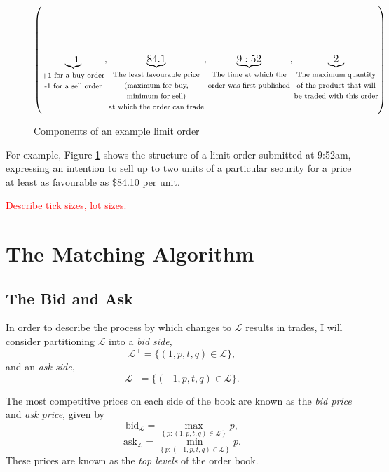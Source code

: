 \documentclass[honours,12pt]{unswthesis}
\numberwithin{equation}{section}
\begin{document}
\begin{figure}[h]
	$$\left(\underbrace{-1}_{\fontsize{8}{8}\begin{matrix} \text{+1 for a buy order}\\ \text{-1 for a sell order}\end{matrix}}\fontsize{12}{8},\underbrace{84.1}_{\fontsize{8}{8}\begin{matrix}\text{The least favourable price}\\\text{(maximum for buy,}\\\text{minimum for sell)}\\\text{at which the order can trade}\end{matrix}}\fontsize{12}{8},\underbrace{9:52}_{\fontsize{8}{8}\begin{matrix}\text{The time at which the}\\\text{order was first published}\end{matrix}}\fontsize{12}{8},\underbrace{2}_{\fontsize{8}{8}\begin{matrix}\text{The maximum quantity}\\\text{of the product that will}\\\text{be traded with this order}\end{matrix}}\right)$$
	\caption{Components of an example limit order}
	\label{fig:limitorder}
\end{figure}

For example, Figure \ref{fig:limitorder} shows the structure of a limit order submitted at 9:52am, expressing an intention to sell up to two units of a particular security for a price at least as favourable as \$84.10 per unit.

\textcolor{red}{Describe tick sizes, lot sizes.}

\newpage
\section{The Matching Algorithm}
\subsection{The Bid and Ask}
In order to describe the process by which changes to $\mathcal{L}$ results in trades, I will consider partitioning $\mathcal{L}$ into a \textit{bid side}, $$\mathcal{L}^+=\{(1,p,t,q)\in\mathcal{L}\},$$ and an \textit{ask side}, $$\mathcal{L}^-=\{(-1,p,t,q)\in\mathcal{L}\}.$$

The most competitive prices on each side of the book are known as the \textit{bid price} and \textit{ask price}, given by
$$\text{bid}_\mathcal{L} = \max_{\left\{p : (1,p,t,q)\in\mathcal{L}\right\}} p,$$
$$\text{ask}_\mathcal{L} = \min_{\left\{p : (-1,p,t,q)\in\mathcal{L}\right\}} p.$$
These prices are known as the \textit{top levels} of the order book.
\end{document}
